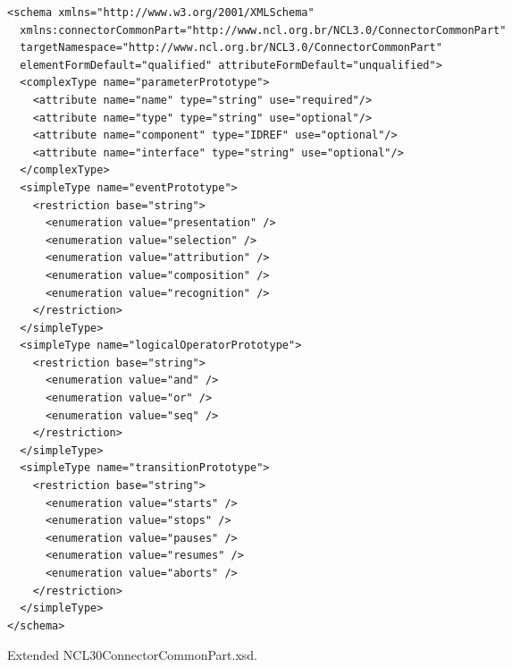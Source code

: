 \documentclass[
  doutorado,
  american
]{ThesisPUC}
\begin{document}
\begin{listing}[!ht]
\begin{verbatim}
<schema xmlns="http://www.w3.org/2001/XMLSchema"
  xmlns:connectorCommonPart="http://www.ncl.org.br/NCL3.0/ConnectorCommonPart"
  targetNamespace="http://www.ncl.org.br/NCL3.0/ConnectorCommonPart"
  elementFormDefault="qualified" attributeFormDefault="unqualified">
  <complexType name="parameterPrototype">
    <attribute name="name" type="string" use="required"/>
    <attribute name="type" type="string" use="optional"/>
    <attribute name="component" type="IDREF" use="optional"/>
    <attribute name="interface" type="string" use="optional"/>
  </complexType>
  <simpleType name="eventPrototype">
    <restriction base="string">
      <enumeration value="presentation" />
      <enumeration value="selection" />
      <enumeration value="attribution" />
      <enumeration value="composition" />
      <enumeration value="recognition" />
    </restriction>
  </simpleType>
  <simpleType name="logicalOperatorPrototype">
    <restriction base="string">
      <enumeration value="and" />
      <enumeration value="or" />
      <enumeration value="seq" />
    </restriction>
  </simpleType>
  <simpleType name="transitionPrototype">
    <restriction base="string">
      <enumeration value="starts" />
      <enumeration value="stops" />
      <enumeration value="pauses" />
      <enumeration value="resumes" />
      <enumeration value="aborts" />
    </restriction>
  </simpleType>
</schema>
\end{verbatim}
\caption{Extended NCL30ConnectorCommonPart.xsd.}
\label{list:annexa3}
\end{listing}
\end{document}
